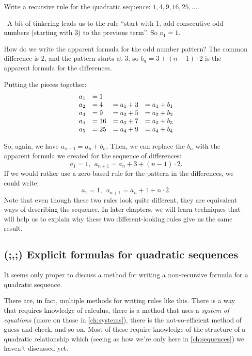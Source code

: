 \begin{boxex}
Write a recursive rule for the quadratic sequence: $1, 4, 9, 16, 25, \dotsc$.

\exsoln\ A bit of tinkering leads us to the rule ``start with 1, add consecutive odd numbers (starting with 3) to the previous term''. So $a_1 = 1$.

How do we write the apparent formula for the odd number pattern? The common difference is 2, and the pattern starts at 3, so $b_n = 3 + (n-1)\cdot2$ is the apparent formula for the differences.

Putting the pieces together:
\[\begin{array}{l@{\quad}l@{\quad}l@{\quad}l}
a_1 &= 1\\
a_2 &= 4	&= a_1 + 3		&= a_1 + b_1\\
a_3 &= 9	&= a_2 + 5		&= a_2 + b_2\\
a_4 &= 16	&= a_3 + 7		&= a_3 + b_3\\
a_5 &= 25	&= a_4 + 9		&= a_4 + b_4
\end{array}\]

So, again, we have $a_{n+1} = a_n + b_n$. Then, we can replace the $b_n$ with the apparent formula we created for the sequence of differences:
\[a_1 = 1, ~~ a_{n+1} = a_n + 3 + (n-1)\cdot 2.\]
If we would rather use a zero-based rule for the pattern in the differences, we could write:
\[a_1 = 1, ~~ a_{n+1} = a_n + 1 + n \cdot 2.\]
Note that even though these two rules look quite different, they are equivalent ways of describing the sequence. In later chapters, we will learn techniques that will help us to explain why these two different-looking rules give us the same result.
\end{boxex}


\subsection{(;,;) Explicit formulas for quadratic sequences}

It seems only proper to discuss a method for writing a non-recursive formula for a quadratic sequence.

There are, in fact, multiple methods for writing rules like this. There is a way that requires knowledge of calculus, there is a method that uses a \textit{system of equations} (more on those in \cref{ch:systems}), there is the not-so-efficient method of guess and check, and so on. Most of these require knowledge of the structure of a quadratic relationship which (seeing as how we're only here in \cref{ch:sequences}) we haven't discussed yet.

